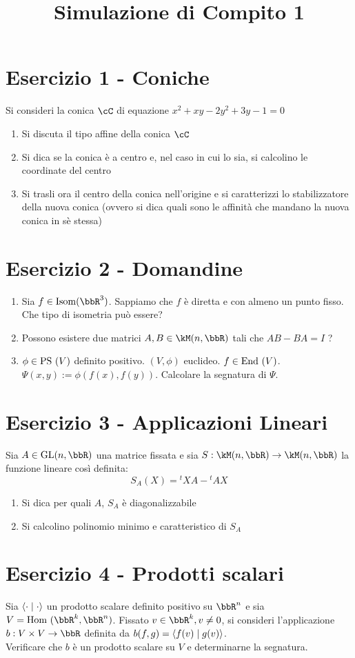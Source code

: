 \documentclass[a4paper,NoNotes,GeneralMath]{stdmdoc}
\begin{document}
	\title{Simulazione di Compito 1}

	\section*{Esercizio 1 - Coniche}
	Si consideri la conica $\cC$ di equazione $x^2+xy-2y^2+3y-1=0$
	\begin{enumerate}
		\item Si discuta il tipo affine della conica $\cC$
		\item Si dica se la conica è a centro e, nel caso in cui lo sia, si calcolino le coordinate del centro
		\item Si trasli ora il centro della conica nell'origine e si caratterizzi lo stabilizzatore della nuova conica (ovvero si dica quali sono le affinità che mandano la nuova conica in sè stessa)
	\end{enumerate}

	\section*{Esercizio 2 - Domandine}
	\begin{enumerate}
		\item Sia $f \in\Isom(\bbR^3)$. Sappiamo che $f$ è diretta e con almeno un punto fisso. Che tipo di isometria può essere?
		\item Possono esistere due matrici $A, B \in \kM(n,\bbR)$ tali che $AB - BA = I$ ?
		\item $\phi \in \mbox{PS }(V)$ definito positivo. $(V, \phi)$ euclideo. $f \in \mbox{End }(V)$. $\Psi(x,y) := \phi(f(x), f(y))$. Calcolare la segnatura di $\Psi$.
	\end{enumerate}

	\section*{Esercizio 3 - Applicazioni Lineari}
		Sia $A \in \GL(n,\bbR)$ una matrice fissata e sia $S: \kM(n, \bbR) \rar \kM(n, \bbR)$ la funzione lineare così definita:
		$$ S_A(X) = {}^tXA - {}^tAX $$
	\begin{enumerate}
		\item Si dica per quali $A$, $S_A$ è diagonalizzabile
		\item Si calcolino polinomio minimo e caratteristico di $S_A$
	\end{enumerate}

	\section*{Esercizio 4 - Prodotti scalari}
		Sia $\langle \cdot \mid \cdot \rangle$ un prodotto scalare definito positivo su $\bbR^n$ e sia $V = \text{Hom }(\bbR^k, \bbR^n)$. Fissato $v \in \bbR^k, v \neq 0$, si consideri l'applicazione $b:V\times V \rar \bbR$ definita da $b(f,g) = \langle f(v) \mid g(v) \rangle$. \\
	Verificare che $b$ è un prodotto scalare su $V$ e determinarne la segnatura.
	
\end{document}
